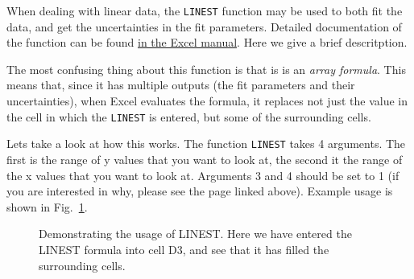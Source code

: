 \documentclass[10pt]{article}
\begin{document}
When dealing with linear data, the  \texttt{LINEST} function may be used to both fit the data, and get the uncertainties in the fit parameters. Detailed documentation of the function can be found \href{https://support.microsoft.com/en-us/office/linest-function-84d7d0d9-6e50-4101-977a-fa7abf772b6d}{in the Excel manual}. Here we give a brief descritption. 

The most confusing thing about this function is that is is an \textit{array formula}. This means that, since it has multiple outputs (the fit parameters and their uncertainties), when Excel evaluates the formula, it replaces not just the value in the cell in which the \texttt{LINEST} is entered, but some of the surrounding cells. 

Lets take a look at how this works. The function  \texttt{LINEST} takes 4 arguments. The first is the range of y values that you want to look at, the second it the range of the x values that you want to look at.  Arguments 3 and 4 should be set to 1 (if you are interested in why, please see the page linked above). Example usage is shown in Fig.~\ref{fig:linest}.

\begin{figure}[]
	\centering
	\begin{sheetpic}


		


	\end{sheetpic}
	\caption{Demonstrating the usage of LINEST. Here we have entered the LINEST formula into cell D3, and see that it has filled the surrounding cells. }%
	\label{fig:linest}
\end{figure}
\end{document}
